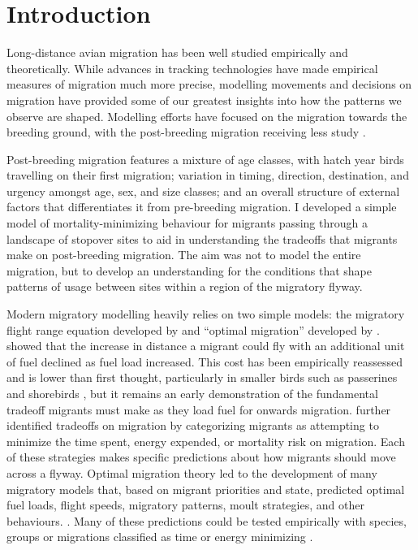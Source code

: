 \section{Introduction}
Long-distance avian migration has been well studied empirically and theoretically. While advances in tracking technologies have made empirical measures of migration much more precise, modelling movements and decisions on migration have provided some of our greatest insights into how the patterns we observe are shaped. Modelling efforts have focused on the migration towards the breeding ground, with the post-breeding migration receiving less study \citep{gallinat2015autumn}. 

Post-breeding migration features a mixture of age classes, with hatch year birds travelling on their first migration; variation in timing, direction, destination, and urgency amongst age, sex, and size classes; and an overall structure of external factors that differentiates it from pre-breeding migration. I developed a simple model of mortality-minimizing behaviour for migrants passing through a landscape of stopover sites to aid in understanding the tradeoffs that migrants make on post-breeding migration. The aim was not to model the entire migration, but to develop an understanding for the conditions that shape patterns of usage between sites within a region of the migratory flyway. 

Modern migratory modelling heavily relies on two simple models: the migratory flight range equation developed by \citet{Pennycuick1975} and  ``optimal migration'' developed by \citet{Alerstam1990}. \citet{Pennycuick1975} showed that the increase in distance a migrant could fly with an additional unit of fuel declined as fuel load increased. This cost has been empirically reassessed and is lower than first thought, particularly in smaller birds such as passerines and shorebirds \citep{kvist2001Nature,Hambly2004}, but it remains an early demonstration of the fundamental tradeoff migrants must make as they load fuel for onwards migration. \citet{Alerstam1990} further identified tradeoffs on migration by categorizing migrants as attempting to minimize the time spent, energy expended, or mortality risk on migration. Each of these strategies makes specific predictions about how migrants should move across a flyway. Optimal migration theory led to the development of many migratory models that, based on migrant priorities and state, predicted optimal fuel loads, flight speeds, migratory patterns, moult strategies, and other behaviours. \citep{Weber1994,Houston1998,Weber1997,Hedenstrom1997,Farmer1998,Weber1998,Barta2006}. Many of these predictions could be tested empirically with species, groups or migrations classified as time or energy minimizing \citep{Lindstrom1992,Scheiffarth2002,Zhao2017,Duijns2009}. 

